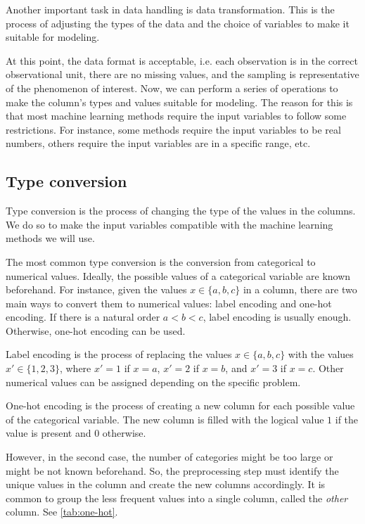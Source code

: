 Another important task in data handling is data transformation.  This is the process of
adjusting the types of the data and the choice of variables to make it suitable for
modeling.

At this point, the data format is acceptable, i.e. each observation is in the correct
observational unit, there are no missing values, and the sampling is representative of the
phenomenon of interest.  Now, we can perform a series of operations to make the
column's types and values suitable for modeling.  The reason for this is that most
machine learning methods require the input variables to follow some restrictions.  For
instance, some methods require the input variables to be real numbers, others require the
input variables are in a specific range, etc.

\subsection{Type conversion}

Type conversion is the process of changing the type of the values in the columns.  We do
so to make the input variables compatible with the machine learning methods we will use.

The most common type conversion is the conversion from categorical to numerical values.
Ideally, the possible values of a categorical variable are known beforehand.
For instance, given the values $x \in \{a, b, c\}$ in a column, there are two main ways to
convert them to numerical values: label encoding and one-hot encoding.  If there is a
natural order $a < b < c$, label encoding is usually enough.  Otherwise, one-hot encoding
can be used.

Label encoding is the process of replacing the values $x \in \{a, b, c\}$ with the values
$x' \in \{1, 2, 3\}$, where $x' = 1$ if $x = a$, $x' = 2$ if $x = b$, and $x' = 3$ if
$x = c$.  Other numerical values can be assigned depending on the specific problem.

One-hot encoding is the process of creating a new column for each possible value
of the categorical variable.  The new column is filled with the logical value $1$ if the
value is present and $0$ otherwise.

However, in the second case, the number of categories might be too large or might be not
known beforehand.  So, the preprocessing step must identify the unique values in the
column and create the new columns accordingly.  It is common to group the less frequent
values into a single column, called the \emph{other} column.  See \cref{tab:one-hot}.

